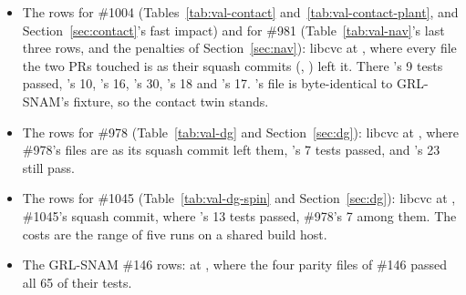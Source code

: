 \documentclass[11pt]{article}
\theoremstyle{remark}
\begin{document}
\begin{itemize}
        Table~\ref{tab:val-steer}): libcvc  at
        , whose ,  and  sources and tests are those
        of \#987's squash commit . There 's 13 tests
        passed, 's 8, 's 7,
        's 10 and 's 13, and so
        did 's and 's 23 each, the defaults'
        goldens among them. Table~\ref{tab:val-live-world}'s rows measure there as they did on
        . The fast impact before \#1004 (Section~\ref{sec:contact}) is that
        commit's plant, driven from Python through libcvc \#1002's binding of the new options
        (, on ; Section~\ref{sec:limits}), on 's
        world in libcvc's  with a wall across the road.
  \item The rows for \#1004 (Tables~\ref{tab:val-contact} and~\ref{tab:val-contact-plant}, and
        Section~\ref{sec:contact}'s fast impact) and for \#981 (Table~\ref{tab:val-nav}'s last
        three rows, and the penalties of Section~\ref{sec:nav}): libcvc  at
        , where every file the two PRs touched is as their squash commits
        (, ) left it. There 's 9
        tests passed, 's 10, 's
        16, 's 30, 's 18 and
        's 17. 's file is byte-identical to
        GRL-SNAM's fixture, so the contact twin stands.
  \item The rows for \#978 (Table~\ref{tab:val-dg} and Section~\ref{sec:dg}): libcvc
         at , where \#978's files are as its squash commit
         left them, 's 7 tests passed, and
        's 23 still pass.
  \item The rows for \#1045 (Table~\ref{tab:val-dg-spin} and Section~\ref{sec:dg}): libcvc
         at , \#1045's squash commit, where
        's 13 tests passed, \#978's 7 among them. The costs are
        the range of five runs on a shared build host.
  \item The GRL-SNAM \#146 rows:  at , where the four parity files of
        \#146 passed all 65 of their tests.
\end{itemize}
\end{document}
